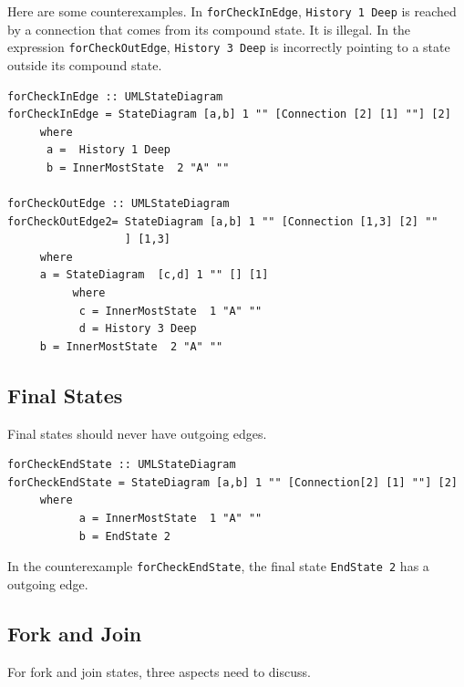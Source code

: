 Here are some counterexamples. In \verb|forCheckInEdge|,  \verb|History 1 Deep| is reached by a connection that comes from its compound state. It is illegal.
In the expression \verb|forCheckOutEdge|, \verb|History 3 Deep| is incorrectly pointing to a state outside its compound state.
\begin{verbatim}
forCheckInEdge :: UMLStateDiagram
forCheckInEdge = StateDiagram [a,b] 1 "" [Connection [2] [1] ""] [2]
     where
      a =  History 1 Deep
      b = InnerMostState  2 "A" ""

forCheckOutEdge :: UMLStateDiagram
forCheckOutEdge2= StateDiagram [a,b] 1 "" [Connection [1,3] [2] ""
                  ] [1,3]
     where
     a = StateDiagram  [c,d] 1 "" [] [1]
          where
           c = InnerMostState  1 "A" ""
           d = History 3 Deep
     b = InnerMostState  2 "A" ""
\end{verbatim}



\subsection{Final States}
\label{sec:representation}
Final states should never have outgoing edges.
\begin{verbatim}
forCheckEndState :: UMLStateDiagram
forCheckEndState = StateDiagram [a,b] 1 "" [Connection[2] [1] ""] [2]
     where 
           a = InnerMostState  1 "A" ""
           b = EndState 2
\end{verbatim}
In the counterexample \verb|forCheckEndState|, the final state \verb|EndState 2| has a outgoing edge.



\subsection{Fork and Join}
\label{sec:representation}
For fork and join states, three aspects need to discuss.

